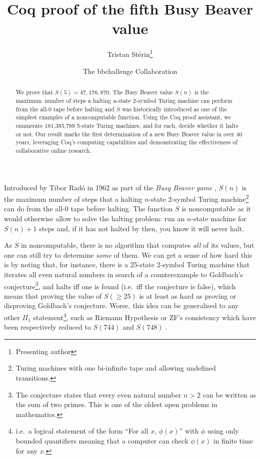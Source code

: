 \documentclass{easychair}
\title{
  \vspace{-1em}  
Coq proof of the fifth Busy Beaver value}
\author{
  Tristan Stérin\thanks{Presenting author}\inst{~1,2} \and The bbchallenge Collaboration\inst{1}
}
\institute{
  bbchallenge.org, see credits,
   \email{bbchallenge@bbchallenge.org}
\and
prgm.dev,
  Paris, France
  \email{tristan@prgm.dev}\\
 }
\newcommand{\radofull}{Tibor Rad\'o\xspace}
\theoremstyle{definition} %
\numberwithin{equation}{section}
\theoremstyle{definition} %
\begin{document}
\maketitle
\vspace{-1em}
\begin{abstract}
  We prove that $S(5) = 47,176,870$. The Busy Beaver value $S(n)$ is the maximum~number of steps a halting n-state 2-symbol Turing machine can perform from the all-0 tape before halting and $S$ was historically introduced as one of the simplest examples of a noncomputable function.  Using the Coq proof assistant, we enumerate 181,385,789 5-state Turing machines, and for each, decide whether it halts or not. 
  Our result marks the first determination of a new Busy Beaver value in over 40 years, leveraging Coq's computing capabilities and demonstrating the effectiveness of collaborative online research.
\end{abstract}
\newcommand{\ie}{i.e.~}
\newcommand{\eg}{e.g.~}

\newcommand{\noncomput}{noncomputable\xspace}
\newcommand{\BBfull}{Busy Beaver\xspace}
\newcommand{\Coq}{Coq\xspace}
\newcommand{\CoqProofReleaseURL}{\url{https://github.com/ccz181078/Coq-BB5}}


Introduced by \radofull in 1962 as part of the \textit{Busy Beaver game} \cite{Rado_1962}, $S(n)$ is the maximum number of steps that a halting $n$-state 2-symbol Turing machine\footnote{Turing machines with one bi-infinite tape and allowing undefined transitions.} can do from the all-0 tape before halting. The function $S$ is noncomputable as it would otherwise allow to solve the 
halting problem: run an $n$-state machine for $S(n)+1$ steps and, if it has not halted by then, you know it will never halt.

As $S$ in noncomputable, there is no algorithm that computes \textit{all} of its values, but one can still try to determine \textit{some} of them. We can get a sense of how hard this is by noting that, for instance, there is a 25-state 2-symbol Turing machine \cite{GoldbachTM27,GoldbachTM25} that iterates all even natural numbers in search of a counterexample to Goldbach's conjecture\footnote{The conjecture states that every even natural number $n>2$ can be written as the sum of two primes. This is one of the oldest open problems in mathematics.}, and halts iff one is found (\ie iff the conjecture is false), which means that proving the value of $S(\geq 25)$ is at least as hard as proving or disproving Goldbach's conjecture. Worse, this idea can be generalised to any other $\Pi_1$ statement\footnote{\ie a logical statement of the form ``For all $x$, $\phi(x)$'' with $\phi$ using only bounded quantifiers meaning that a computer can check $\phi(x)$ in finite time for any $x$.}, such as Riemann Hypothesis or ZF's consistency which have been respectively reduced to $S(744)$ and $S(748)$ \cite{RiemannTM,Yedidia2016,ZFTM,Yedidia2016,BusyBeaverFrontier,BB748Thesis}. 
\end{document}
